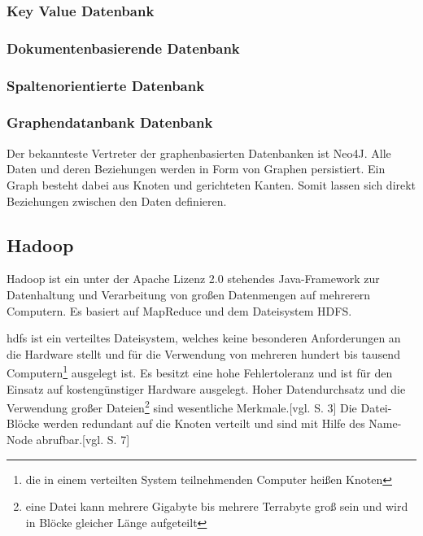 \subsubsection{Key Value Datenbank}



\subsubsection{Dokumentenbasierende Datenbank}

\subsubsection{Spaltenorientierte Datenbank}

\subsubsection{Graphendatanbank Datenbank}

Der bekannteste Vertreter der graphenbasierten Datenbanken ist Neo4J.
Alle Daten und deren Beziehungen werden in Form von Graphen persistiert.
Ein Graph besteht dabei aus Knoten und gerichteten Kanten.
Somit lassen sich direkt Beziehungen zwischen den Daten definieren.



\subsection{Hadoop}

Hadoop ist ein unter der Apache Lizenz 2.0 stehendes Java-Framework zur Datenhaltung und Verarbeitung von großen Datenmengen auf mehrerern Computern.
Es basiert auf MapReduce und dem Dateisystem HDFS.

\Gls{hdfs} ist ein verteiltes Dateisystem, welches keine besonderen Anforderungen an die Hardware stellt und für die Verwendung von mehreren hundert bis tausend Computern\footnote{die in einem verteilten System teilnehmenden Computer heißen Knoten} ausgelegt ist.
Es besitzt eine hohe Fehlertoleranz und ist für den Einsatz auf kostengünstiger Hardware ausgelegt.
Hoher Datendurchsatz und die Verwendung großer Dateien\footnote{eine Datei kann mehrere Gigabyte bis mehrere Terrabyte groß sein und wird in Blöcke gleicher Länge aufgeteilt} sind wesentliche Merkmale.[vgl. \cite{paper:hadoop} S. 3]
Die Datei-Blöcke werden redundant auf die Knoten verteilt und sind mit Hilfe des Name-Node abrufbar.[vgl. \cite{ba:dan} S. 7]

